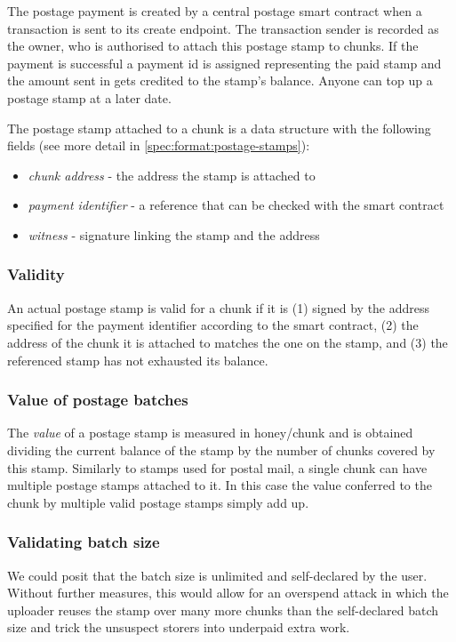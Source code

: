 The postage payment is created by a central postage smart contract when a transaction is sent to its create  endpoint.
The transaction sender is recorded as the owner, who is authorised to attach this postage stamp to chunks. If the payment is successful a payment id is assigned representing the paid stamp  and the amount sent in gets credited to the  stamp's balance. Anyone can top up a postage stamp at a later date.

The postage stamp attached to a chunk is a data structure with the following fields (see more detail in \ref{spec:format:postage-stamps}):

\begin{itemize}
    \item \emph{chunk address} - the address the stamp is attached to 
    \item \emph{payment identifier} - a reference that can be checked with the smart contract
    \item \emph{witness} - signature linking the stamp and the address 
\end{itemize}

\subsubsection{Validity}

An actual postage stamp is valid for a chunk if it is (1) signed by the address specified for the payment identifier according to the smart contract, (2) the address of the chunk it is attached to matches the one on the stamp, and (3) the referenced stamp has not exhausted its balance.

\subsubsection{Value of postage batches}

The \emph{value} of a postage stamp is measured in honey/chunk and is obtained dividing the current balance of the stamp by the number of chunks covered by this stamp. Similarly to stamps used for postal mail, a single chunk can have multiple postage stamps attached to it. In this case the value  conferred to the chunk by multiple valid postage stamps simply add up. 

\subsubsection{Validating batch size}

We could posit that the batch size is unlimited and self-declared by the user. Without further measures, this would allow for an overspend attack in which the uploader reuses the stamp over many more chunks than the self-declared batch size and trick the unsuspect storers into underpaid extra work. 

